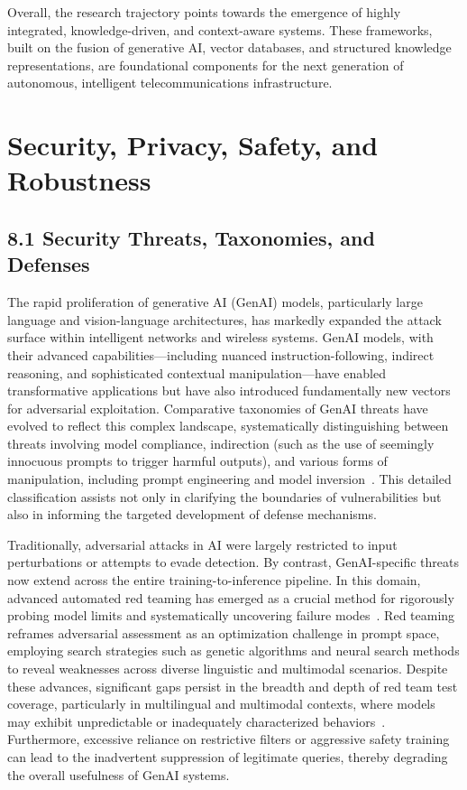 Overall, the research trajectory points towards the emergence of highly integrated, knowledge-driven, and context-aware systems. These frameworks, built on the fusion of generative AI, vector databases, and structured knowledge representations, are foundational components for the next generation of autonomous, intelligent telecommunications infrastructure.

\section{Security, Privacy, Safety, and Robustness}

\subsection{8.1 Security Threats, Taxonomies, and Defenses}

The rapid proliferation of generative AI (GenAI) models, particularly large language and vision-language architectures, has markedly expanded the attack surface within intelligent networks and wireless systems. GenAI models, with their advanced capabilities—including nuanced instruction-following, indirect reasoning, and sophisticated contextual manipulation—have enabled transformative applications but have also introduced fundamentally new vectors for adversarial exploitation. Comparative taxonomies of GenAI threats have evolved to reflect this complex landscape, systematically distinguishing between threats involving model compliance, indirection (such as the use of seemingly innocuous prompts to trigger harmful outputs), and various forms of manipulation, including prompt engineering and model inversion~\cite{ref3}. This detailed classification assists not only in clarifying the boundaries of vulnerabilities but also in informing the targeted development of defense mechanisms.

Traditionally, adversarial attacks in AI were largely restricted to input perturbations or attempts to evade detection. By contrast, GenAI-specific threats now extend across the entire training-to-inference pipeline. In this domain, advanced automated red teaming has emerged as a crucial method for rigorously probing model limits and systematically uncovering failure modes~\cite{ref3}. Red teaming reframes adversarial assessment as an optimization challenge in prompt space, employing search strategies such as genetic algorithms and neural search methods to reveal weaknesses across diverse linguistic and multimodal scenarios. Despite these advances, significant gaps persist in the breadth and depth of red team test coverage, particularly in multilingual and multimodal contexts, where models may exhibit unpredictable or inadequately characterized behaviors~\cite{ref3}. Furthermore, excessive reliance on restrictive filters or aggressive safety training can lead to the inadvertent suppression of legitimate queries, thereby degrading the overall usefulness of GenAI systems.

